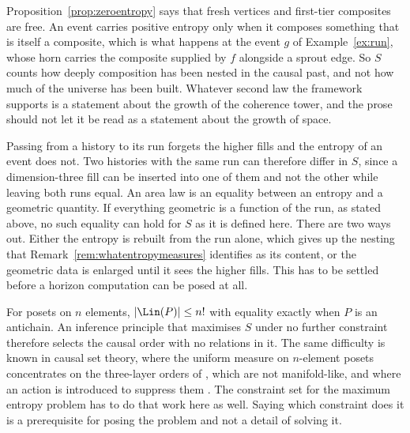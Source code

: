 \begin{remark}
\label{rem:whatentropymeasures}
Proposition~\ref{prop:zeroentropy} says that fresh vertices and first-tier composites are free.
An event carries positive entropy only when it composes something that is itself a composite, which is what happens at the event $g$ of Example~\ref{ex:run}, whose horn carries the composite supplied by $f$ alongside a sprout edge.
So $S$ counts how deeply composition has been nested in the causal past, and not how much of the universe has been built.
Whatever second law the framework supports is a statement about the growth of the coherence tower, and the prose should not let it be read as a statement about the growth of space.
\end{remark}

\begin{remark}
\label{rem:notafunctionofrun}
Passing from a history to its run forgets the higher fills and the entropy of an event does not.
Two histories with the same run can therefore differ in $S$, since a dimension-three fill can be inserted into one of them and not the other while leaving both runs equal.
An area law is an equality between an entropy and a geometric quantity.
If everything geometric is a function of the run, as stated above, no such equality can hold for $S$ as it is defined here.
There are two ways out.
Either the entropy is rebuilt from the run alone, which gives up the nesting that Remark~\ref{rem:whatentropymeasures} identifies as its content, or the geometric data is enlarged until it sees the higher fills.
This has to be settled before a horizon computation can be posed at all.
\end{remark}

\begin{remark}
\label{rem:antichain}
For posets on $n$ elements, $|\Lin(P)| \leq n!$ with equality exactly when $P$ is an antichain.
An inference principle that maximises $S$ under no further constraint therefore selects the causal order with no relations in it.
The same difficulty is known in causal set theory, where the uniform measure on $n$-element posets concentrates on the three-layer orders of \citet{kleitman1975}, which are not manifold-like, and where an action is introduced to suppress them \citep{surya2019living}.
The constraint set for the maximum entropy problem has to do that work here as well.
Saying which constraint does it is a prerequisite for posing the problem and not a detail of solving it.
\end{remark}

